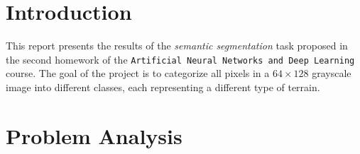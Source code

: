 \documentclass[11pt]{article}
\begin{document}
\begin{multicols}{2}

      \section{Introduction}


      This report presents the results of the \textit{semantic segmentation}\cite{long2015fullyconvolutionalnetworkssemantic}
      task proposed in the second homework of the \texttt{Artificial Neural Networks and Deep Learning} course. The goal of the project is to categorize all pixels in a $64\times128$ grayscale image into different classes, each representing a different type of terrain.

      \section{Problem Analysis}


\end{multicols}
\end{document}

